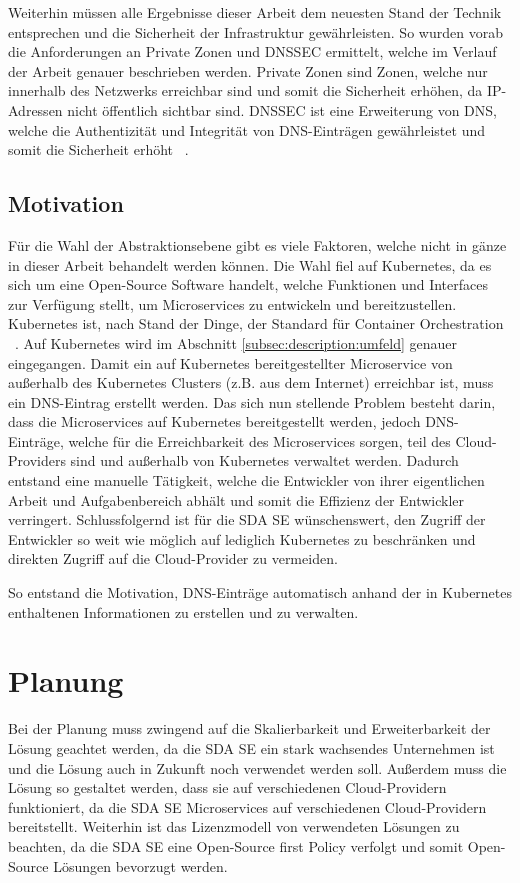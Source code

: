 Weiterhin müssen alle Ergebnisse dieser Arbeit dem neuesten Stand der Technik entsprechen und die Sicherheit der Infrastruktur gewährleisten.
So wurden vorab die Anforderungen an Private Zonen und DNSSEC ermittelt, welche im Verlauf der Arbeit genauer beschrieben werden.
Private Zonen sind Zonen, welche nur innerhalb des Netzwerks erreichbar sind und somit die Sicherheit erhöhen, da IP-Adressen nicht öffentlich sichtbar sind.
DNSSEC ist eine Erweiterung von DNS, welche die Authentizität und Integrität von DNS-Einträgen gewährleistet und somit die Sicherheit erhöht ~\cite{arends2005rfc}.

\subsection{Motivation}
\label{subsec:description:motivation}
Für die Wahl der Abstraktionsebene gibt es viele Faktoren, welche nicht in gänze in dieser Arbeit behandelt werden können.
Die Wahl fiel auf Kubernetes, da es sich um eine Open-Source Software handelt, welche Funktionen und Interfaces zur Verfügung stellt, um Microservices zu entwickeln und bereitzustellen.
Kubernetes ist, nach Stand der Dinge, der Standard für Container Orchestration ~\cite[p.~2]{SpringerNature:2022}.
Auf Kubernetes wird im Abschnitt \ref{subsec:description:umfeld} genauer eingegangen.
\medskip
Damit ein auf Kubernetes bereitgestellter Microservice von außerhalb des Kubernetes Clusters (z.B. aus dem Internet) erreichbar ist, muss ein \ac{DNS}-Eintrag erstellt werden.
Das sich nun stellende Problem besteht darin, dass die Microservices auf Kubernetes bereitgestellt werden, jedoch DNS-Einträge, welche für die Erreichbarkeit des Microservices sorgen, teil des Cloud-Providers sind und außerhalb von Kubernetes verwaltet werden.
Dadurch entstand eine manuelle Tätigkeit, welche die Entwickler von ihrer eigentlichen Arbeit und Aufgabenbereich abhält und somit die Effizienz der Entwickler verringert.
Schlussfolgernd ist für die SDA SE wünschenswert, den Zugriff der Entwickler so weit wie möglich auf lediglich Kubernetes zu beschränken und direkten Zugriff auf die Cloud-Provider zu vermeiden.
\medskip

So entstand die Motivation, DNS-Einträge automatisch anhand der in Kubernetes enthaltenen Informationen zu erstellen und zu verwalten.

\section{Planung}
\label{sec:description:planung}
Bei der Planung muss zwingend auf die Skalierbarkeit und Erweiterbarkeit der Lösung geachtet werden, da die SDA SE ein stark wachsendes Unternehmen ist und die Lösung auch in Zukunft noch verwendet werden soll.
Außerdem muss die Lösung so gestaltet werden, dass sie auf verschiedenen Cloud-Providern funktioniert, da die SDA SE Microservices auf verschiedenen Cloud-Providern bereitstellt.
Weiterhin ist das Lizenzmodell von verwendeten Lösungen zu beachten, da die SDA SE eine Open-Source first Policy verfolgt und somit Open-Source Lösungen bevorzugt werden.

